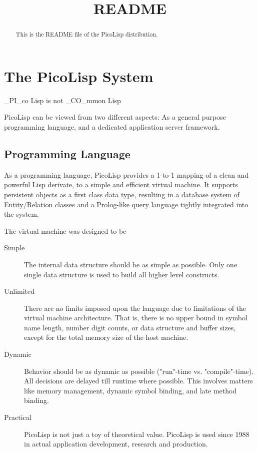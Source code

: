 \title{README}

\maketitle



\begin{abstract}
  This is the README file of the PicoLisp distribution. 
\end{abstract}

\section{The PicoLisp System}
\label{sec:readme-the-picolisp-system}


\begin{wideverbatim}
  _PI_co Lisp is not _CO_mmon Lisp
\end{wideverbatim}

PicoLisp can be viewed from two different aspects: As a general purpose
programming language, and a dedicated application server framework.


\subsection{Programming Language}
\label{sec:readme-programming-language}

As a programming language, PicoLisp provides a 1-to-1 mapping of a
clean and powerful Lisp derivate, to a simple and efficient virtual
machine. It supports persistent objects as a first class data type,
resulting in a database system of Entity/Relation classes and a
Prolog-like query language tightly integrated into the system.

The virtual machine was designed to be
\begin{description}
\item[Simple] The internal data structure should be as simple as
  possible. Only one single data structure is used to build all higher
  level constructs.
\item[Unlimited] There are no limits imposed upon the language due to
  limitations of the virtual machine architecture. That is, there is
  no upper bound in symbol name length, number digit counts, or data
  structure and buffer sizes, except for the total memory size of the
  host machine.
\item[Dynamic] Behavior should be as dynamic as possible ("run"-time
  vs. "compile"-time). All decisions are delayed till runtime where
  possible. This involves matters like memory management, dynamic
  symbol binding, and late method binding.
\item[Practical] PicoLisp is not just a toy of theoretical value.
  PicoLisp is used since 1988 in actual application development,
  research and production.
\end{description}
   
